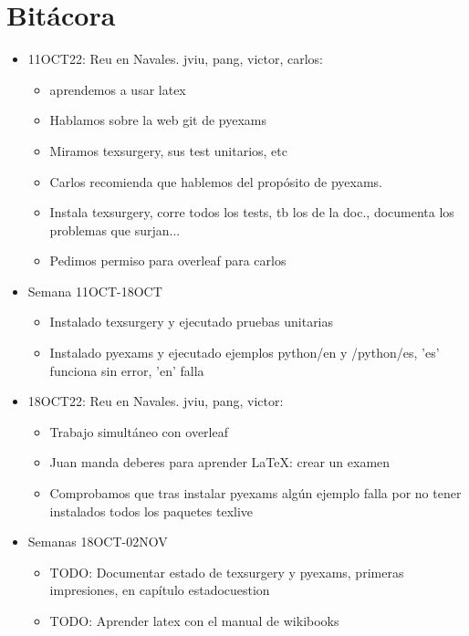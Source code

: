 \chapter{Bitácora}

\begin{itemize}
    \item 11OCT22: Reu en Navales. jviu, pang, victor, carlos: 
    \begin{itemize}
        \item 
    aprendemos a usar latex
        \item Hablamos sobre la web git de pyexams \cite{pyexamsgit}
        \item Miramos texsurgery, sus test unitarios, etc
        \item Carlos recomienda que hablemos del propósito de pyexams.
    \end{itemize}
    \begin{itemize}
        \item Instala texsurgery, corre todos los tests, tb los de la doc., documenta los problemas que surjan...
        \item Pedimos permiso para overleaf para carlos 
    \end{itemize}
    \item Semana 11OCT-18OCT
    \begin{itemize}
        \item Instalado texsurgery y ejecutado pruebas unitarias
        \item Instalado pyexams y ejecutado ejemplos python/en y /python/es, 'es' funciona sin error, 'en' falla 
    \end{itemize}
    \item 18OCT22: Reu en Navales. jviu, pang, victor:
    \begin{itemize}
        \item Trabajo simultáneo con overleaf
        \item Juan manda deberes para aprender LaTeX: crear un examen
        \item Comprobamos que tras instalar pyexams algún ejemplo falla por no tener instalados todos los paquetes texlive
    \end{itemize}
    \item Semanas 18OCT-02NOV
    \begin{itemize}
        \item TODO: Documentar estado de texsurgery y pyexams, primeras impresiones, en capítulo estadocuestion
        \item TODO: Aprender latex con el manual de wikibooks

\end{itemize}
\end{itemize}
